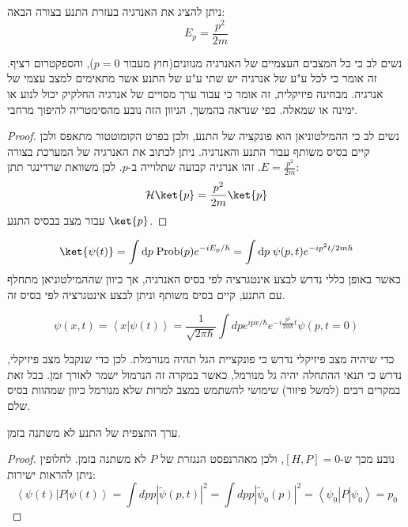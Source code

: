 \documentclass{tstextbook}
\begin{document}
\begin{proposition}
ניתן להציג את האנרגיה בעזרת התנע בצורה הבאה:
$$E_{p}={\frac{p^{2}}{2m}}$$

\end{proposition}
\begin{remark}
נשים לב כי כל המצבים העצמיים של האנרגיה מנוונים(חוץ מעבור \(p=0\)), והספקטרום רציף. זה אומר כי לכל ע"ע של אנרגיה יש שתי ע"ע של התנע אשר מתאימים למצב עצמי של אנרגיה. מבחינה פיזיקלית, זה אומר כי עבור ערך מסויים של אנרגיה החלקיק יכול לנוע או ימינה או שמאלה. כפי שנראה בהמשך, הניוון הזה נובע מהסימטריה להיפוך מרחבי.

\end{remark}
\begin{proof}
נשים לב כי ההמילטוניאן הוא פונקציה של התנע, ולכן בפרט הקומוטטור מתאפס ולכן קיים בסיס משותף עבור התנע והאנרגיה. ניתן לכתוב את האנרגיה של המערכת בצורה \(E=\frac{p^{2}}{2m}\). זהו אנרגיה קבועה שתלוייה ב-\(p\). לכן משוואת שרדינגר תתן:
$$\mathcal{H}\ket{p} =\frac{p^{2}}{2m}\ket{p} $$
עבור מצב בבסיס התנע \(\ket{p}\).

\end{proof}
\begin{proposition}
$$\ket{\psi(t)} = \int \mathrm{d}p \;\mathrm{Prob}(p) e^{-i E_{p}/\hbar}=\int\mathrm{d}p\;\psi(p,t)e^{ -ip^{2}t/2m\hbar  }$$
כאשר באופן כללי נדרש לבצע אינטגרציה לפי בסיס האנרגיה, אך כיוון שההמילטוניאן מתחלף עם התנע, קיים בסיס משותף וניתן לבצע אינטגרציה לפי בסיס זה.

\end{proposition}
\begin{proposition}
$$\psi\left(x,t\right)=\left\langle x|\psi\left(t\right)\right\rangle={\frac{1}{\sqrt{2\pi\hbar}}}\int d p e^{i p x/\hbar}e^{-i{\frac{p^{2}}{2m\hbar}}t}{\psi}\left(p,t=0\right)$$

\end{proposition}
\begin{remark}
כדי שיהיה מצב פיזיקלי נדרש כי פונקציית הגל תהיה מנורמלת. לכן כדי שנקבל מצב פיזיקלי, נדרש כי תנאי ההתחלה יהיה גל מנורמל, כאשר במקרה זה הנרמול ישמר לאורך זמן. בכל זאת במקרים רבים (למשל פיזור) שימושי להשתמש במצב למרות שלא מנורמל כיוון שמהוות בסיס שלם.

\end{remark}
\begin{proposition}
ערך התצפית של התנע לא משתנה בזמן.

\end{proposition}
\begin{proof}
נובע מכך ש-\([H,P]=0\), ולכן מאהרנפסט הנגזרת של \(P\) לא משתנה בזמן. לחלופין ניתן להראות ישירות:
$$\left\langle\psi\left(t\right)\right|P\left|\psi\left(t\right)\right\rangle=\int d p p\left|\widetilde{\psi}\left(p,t\right)\right|^{2}=\int d p p\left|\widetilde{\psi}_{0}\left(p\right)\right|^{2}=\left\langle\psi_{0}\right|P\left|\psi_{0}\right\rangle=p_{0}$$

\end{proof}
\end{document}
